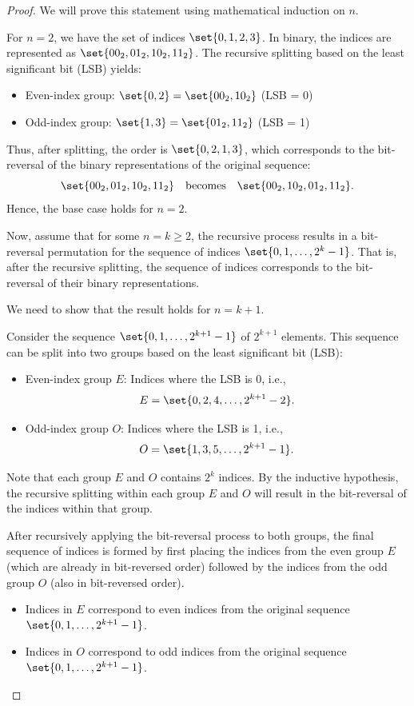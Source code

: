 \begin{proof}
	We will prove this statement using mathematical induction on $n$.
	
	For $n = 2$, we have the set of indices $\set{0, 1, 2, 3}$. In binary, the indices are represented as $\set{00_2, 01_2, 10_2, 11_2}$. The recursive splitting based on the least significant bit (LSB) yields:
	\begin{itemize}
		\item Even-index group: $\set{0, 2}= \set{00_2, 10_2}$ (LSB = 0)
		\item Odd-index group: $\set{1, 3}= \set{01_2, 11_2}$ (LSB = 1)
	\end{itemize}
	
	Thus, after splitting, the order is $\set{0, 2, 1, 3}$, which corresponds to the bit-reversal of the binary representations of the original sequence:
	\[
	\set{00_2, 01_2, 10_2, 11_2} \quad \text{becomes} \quad \set{00_2, 10_2, 01_2, 11_2}.
	\]
	Hence, the base case holds for $n=2$.
	
	Now, assume that for some $n = k \geq 2$, the recursive process results in a bit-reversal permutation for the sequence of indices $\set{0, 1, \ldots, 2^k - 1}$. That is, after the recursive splitting, the sequence of indices corresponds to the bit-reversal of their binary representations.
	
	We need to show that the result holds for $n = k+1$.
	
	Consider the sequence $\set{0, 1, \ldots, 2^{k+1} - 1}$ of $2^{k+1}$ elements. This sequence can be split into two groups based on the least significant bit (LSB):
	\begin{itemize}
		\item Even-index group $E$: Indices where the LSB is 0, i.e.,
		\[
		E = \set{0, 2, 4, \ldots, 2^{k+1} - 2}.
		\]
		\item Odd-index group $O$: Indices where the LSB is 1, i.e.,
		\[
		O = \set{1, 3, 5, \ldots, 2^{k+1} - 1}.
		\]
	\end{itemize}
	
	Note that each group $E$ and $O$ contains $2^k$ indices. By the inductive hypothesis, the recursive splitting within each group $E$ and $O$ will result in the bit-reversal of the indices within that group.
	
	After recursively applying the bit-reversal process to both groups, the final sequence of indices is formed by first placing the indices from the even group $E$ (which are already in bit-reversed order) followed by the indices from the odd group $O$ (also in bit-reversed order).
	\begin{itemize}
		\item Indices in $E$ correspond to even indices from the original sequence $\set{0, 1, \ldots, 2^{k+1} - 1}$.
		\item Indices in $O$ correspond to odd indices from the original sequence $\set{0, 1, \ldots, 2^{k+1} - 1}$.
	\end{itemize}
	

\end{proof}
